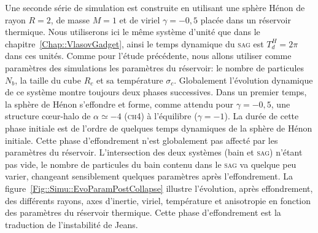 
	Une seconde série de simulation est construite en utilisant une sphère Hénon de rayon $R=2$, de masse $M=1$ et de viriel $\gamma=-0,5$ placée
	dans un réservoir thermique. Nous utiliserons ici le même système d'unité que dans le chapitre~\ref{Chap::VlasovGadget}, ainsi le temps
	dynamique du \textsc{sag} est $T_d^H = 2\pi$ dans ces unités. Comme pour l'étude précédente, nous allons utiliser comme paramètres des
	simulations les paramètres du réservoir: le nombre de particules $N_b$, la taille du cube $R_c$ et sa température $\sigma_c$. Globalement
	l'évolution dynamique de ce système montre toujours deux phases successives. Dans un premier temps, la sphère de Hénon s'effondre et forme,
	comme attendu pour $\gamma=-0,5$, une structure cœur-halo de $\alpha\simeq-4$ (\textsc{ch4}) à l'équilibre ($\gamma=-1$). La durée de cette
	phase initiale est de l'ordre de quelques temps dynamiques de la sphère de Hénon initiale. Cette phase d'effondrement n'est globalement pas
	affecté par les paramètres du réservoir. L'intersection des deux systèmes (bain et \textsc{sag}) n'étant pas vide, le nombre de particules du
	bain contenu dans le \textsc{sag} va quelque peu varier, changeant sensiblement quelques paramètres après l'effondrement. La
	figure~\ref{Fig::Simu::EvoParamPostCollapse} illustre l'évolution, après effondrement, des différents rayons, axes d'inertie, viriel,
	température et anisotropie en fonction des paramètres du réservoir thermique. Cette phase d'effondrement est la traduction de l'instabilité de
	Jeans.

